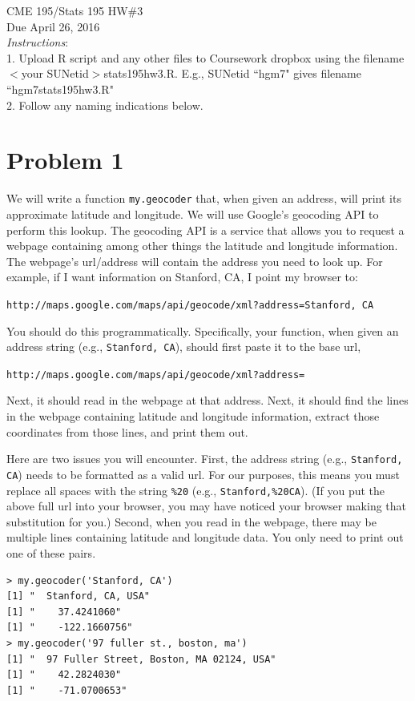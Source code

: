 \documentclass[11pt]{article}
\theoremstyle{plain}
\theoremstyle{definition}
\begin{document}
\noindent CME 195/Stats 195 HW\#3\\
Due April 26, 2016\\
\noindent \emph{Instructions}:\\1. Upload R script and any other files to Coursework dropbox using the filename \\$<$your SUNetid$>$stats195hw3.R. E.g., SUNetid ``hgm7" gives filename ``hgm7stats195hw3.R"\\
2. Follow any naming indications below.
\\
\section*{Problem 1}
We will write a function \texttt{my.geocoder} that, when given an address, will print its approximate latitude and longitude. We will use Google's geocoding API to perform this lookup. The geocoding API is a service that allows you to request a webpage containing among other things the latitude and longitude information. The webpage's url/address will contain the address you need to look up. For example, if I want information on Stanford, CA, I point my browser to:

\texttt{http://maps.google.com/maps/api/geocode/xml?address=Stanford, CA}

\noindent You should do this programmatically. Specifically, your function, when given an address string (e.g., \texttt{Stanford, CA}), should first paste it to the base url,

 \texttt{http://maps.google.com/maps/api/geocode/xml?address=}

\noindent Next, it should read in the webpage at that address. Next, it should find the lines in the webpage containing latitude and longitude information, extract those coordinates from those lines, and print them out.

Here are two issues you will encounter. First, the address string (e.g., \texttt{Stanford, CA}) needs to be formatted as a valid url. For our purposes, this means you must replace all spaces with the string \texttt{\%20} (e.g., \texttt{Stanford,\%20CA}). (If you put the above full url into your browser, you may have noticed your browser making that substitution for you.) Second, when you read in the webpage, there may be multiple lines containing latitude and longitude data. You only need to print out one of these pairs.

\begin{verbatim}
> my.geocoder('Stanford, CA')
[1] "  Stanford, CA, USA"
[1] "    37.4241060"
[1] "    -122.1660756"
> my.geocoder('97 fuller st., boston, ma')
[1] "  97 Fuller Street, Boston, MA 02124, USA"
[1] "    42.2824030"
[1] "    -71.0700653"
\end{verbatim}
\end{document}
